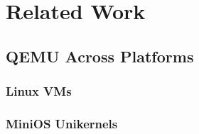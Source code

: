 \chapter{Related Work}
\label{chapter:related-work}

\section{QEMU Across Platforms}
\label{sec:qemu-across-platforms}

\subsection{Linux VMs}
\label{subsec:linux-vms}

\subsection{MiniOS Unikernels}
\label{subsec:minios-unikernels}
